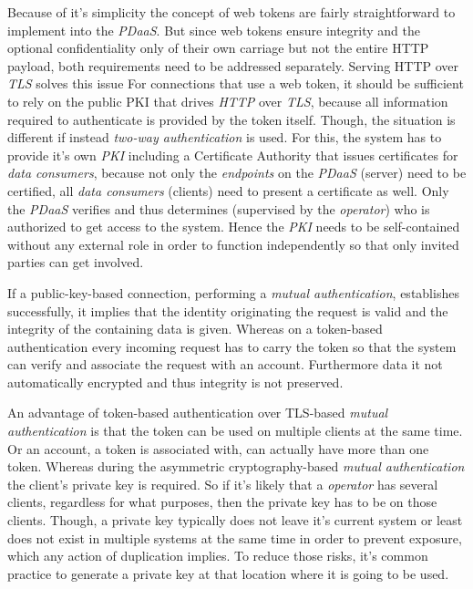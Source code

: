 \documentclass[12pt,english,a4paper,titlepage,cleardoublepage=empty,dottedtoc]{report}
\begin{document}
Because of it's simplicity the concept of web tokens are fairly
straightforward to implement into the \emph{PDaaS}. But since web tokens
ensure integrity and the optional confidentiality only of their own
carriage but not the entire HTTP payload, both requirements need to be
addressed separately. Serving HTTP over \emph{TLS} solves this issue For
connections that use a web token, it should be sufficient to rely on the
public PKI that drives \emph{HTTP} over \emph{TLS}, because all
information required to authenticate is provided by the token itself.
Though, the situation is different if instead \emph{two-way
authentication} is used. For this, the system has to provide it's own
\emph{PKI} including a Certificate Authority that issues certificates
for \emph{data consumers}, because not only the \emph{endpoints} on the
\emph{PDaaS} (server) need to be certified, all \emph{data consumers}
(clients) need to present a certificate as well. Only the \emph{PDaaS}
verifies and thus determines (supervised by the \emph{operator}) who is
authorized to get access to the system. Hence the \emph{PKI} needs to be
self-contained without any external role in order to function
independently so that only invited parties can get involved.

If a public-key-based connection, performing a \emph{mutual
authentication}, establishes successfully, it implies that the identity
originating the request is valid and the integrity of the containing
data is given. Whereas on a token-based authentication every incoming
request has to carry the token so that the system can verify and
associate the request with an account. Furthermore data it not
automatically encrypted and thus integrity is not preserved.

An advantage of token-based authentication over TLS-based \emph{mutual
authentication} is that the token can be used on multiple clients at the
same time. Or an account, a token is associated with, can actually have
more than one token. Whereas during the asymmetric cryptography-based
\emph{mutual authentication} the client's private key is required. So if
it's likely that a \emph{operator} has several clients, regardless for
what purposes, then the private key has to be on those clients. Though,
a private key typically does not leave it's current system or least does
not exist in multiple systems at the same time in order to prevent
exposure, which any action of duplication implies. To reduce those
risks, it's common practice to generate a private key at that location
where it is going to be used.
\end{document}
